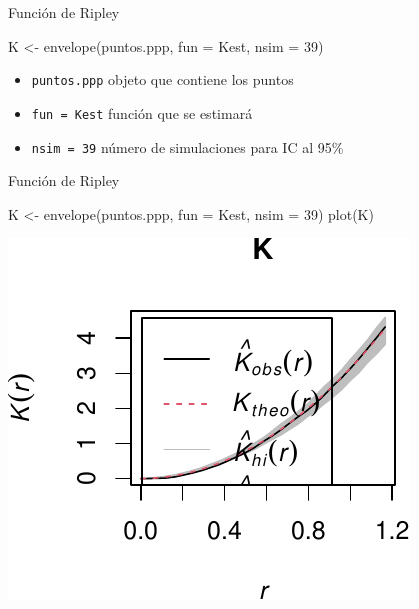 \documentclass[
  11pt,
  ignorenonframetext,
]{beamer}
\newenvironment{Shaded}{}{}
\newcommand{\AttributeTok}[1]{\textcolor[rgb]{0.49,0.56,0.16}{#1}}
\newcommand{\DecValTok}[1]{\textcolor[rgb]{0.25,0.63,0.44}{#1}}
\newcommand{\FunctionTok}[1]{\textcolor[rgb]{0.02,0.16,0.49}{#1}}
\newcommand{\NormalTok}[1]{#1}
\newcommand{\OtherTok}[1]{\textcolor[rgb]{0.00,0.44,0.13}{#1}}
\providecommand{\tightlist}{%
  \setlength{\itemsep}{0pt}\setlength{\parskip}{0pt}}
\begin{document}
\begin{frame}[fragile]{Función de Ripley}
\protect\hypertarget{funciuxf3n-de-ripley-1}{}
\begin{Shaded}
\begin{Highlighting}[]
\NormalTok{K }\OtherTok{\textless{}{-}} \FunctionTok{envelope}\NormalTok{(puntos.ppp, }\AttributeTok{fun =}\NormalTok{ Kest, }\AttributeTok{nsim =} \DecValTok{39}\NormalTok{)}
\end{Highlighting}
\end{Shaded}

\begin{itemize}
\tightlist
\item
  \texttt{puntos.ppp} objeto que contiene los puntos
\item
  \texttt{fun\ =\ Kest} función que se estimará
\item
  \texttt{nsim\ =\ 39} número de simulaciones para IC al 95\%
\end{itemize}
\end{frame}

\begin{frame}[fragile]{Función de Ripley}
\protect\hypertarget{funciuxf3n-de-ripley-2}{}
\begin{Shaded}
\begin{Highlighting}[]
\NormalTok{K }\OtherTok{\textless{}{-}} \FunctionTok{envelope}\NormalTok{(puntos.ppp, }\AttributeTok{fun =}\NormalTok{ Kest, }\AttributeTok{nsim =} \DecValTok{39}\NormalTok{)}
\FunctionTok{plot}\NormalTok{(K)}
\end{Highlighting}
\end{Shaded}

\begin{center}\includegraphics{Tutorial-spatstat_files/figure-beamer/unnamed-chunk-18-1} \end{center}
\end{frame}
\end{document}

